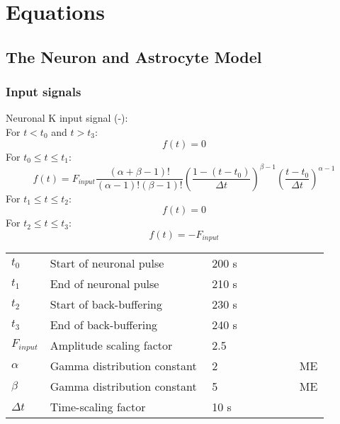 
\section{Equations}\label{sec:equations}

\subsection{The Neuron and Astrocyte Model}

\subsubsection*{Input signals} \label{sec:InputSignal}

Neuronal \gls{K} input signal (-):\\
\vspace{0.25cm}
%
For $ t<t_0$ and $t>t_3$:
\begin{equation}
f(t)=0
\end{equation}
%
For $ t_0 \leq t \leq t_1$:
\begin{equation}
f(t)=F_{input} \dfrac{(\alpha+\beta-1)!}{(\alpha-1)!(\beta-1)!} \left( \dfrac{1-(t-t_0)}{\Delta t}\right) ^{\beta -1} \left( \dfrac{t-t_0}{\Delta t}\right) ^{\alpha -1} 
\end{equation}
%
For $ t_1 \leq t \leq t_2$:
\begin{equation}
f(t)=0
\end{equation}
%
For $ t_2 \leq t \leq t_3$:
\begin{equation}
f(t)=-F_{input}
\end{equation}
%
\begin{table}[h!]
\centering
\begin{tabular}{ p{0.09\linewidth}  >{\footnotesize} p{0.5\linewidth}  >{\footnotesize} p{0.27\linewidth} >{\footnotesize} p{0.03\linewidth} }
\hline
$t_0$ 			& Start of neuronal pulse	& 200 s &    \\
$t_1$ 			& End of neuronal pulse	& 210 s &   \\
$t_2$ 			& Start of back-buffering	& 230 s &    \\
$t_3$ 			& End of back-buffering	& 240 s &    \\
$F_{input}$ 	& Amplitude scaling factor 	& 2.5 	&    \\
$\alpha$ 		& Gamma distribution constant	& 2 	&  ME\footnotemark \\
$\beta$ 		& Gamma distribution constant	& 5 	&  ME  \\
$\Delta t$ 		& Time-scaling factor	& 10 s	&    \\
\hline
\end{tabular}
\end{table}
% 
